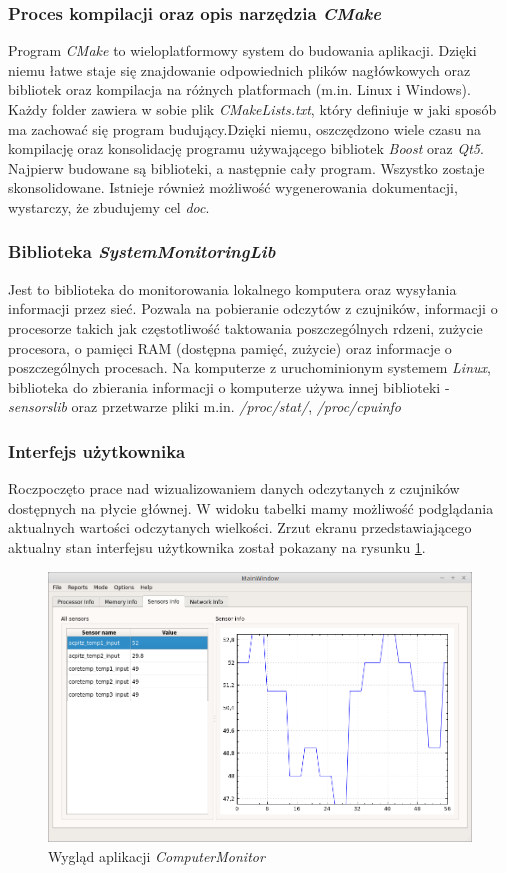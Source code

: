 \documentclass[a4paper]{article}
\begin{document}
\subsubsection{Proces kompilacji oraz opis narzędzia \textit{CMake}}
Program \textit{CMake} to wieloplatformowy system do budowania aplikacji. Dzięki niemu łatwe staje się
znajdowanie odpowiednich plików nagłówkowych oraz bibliotek oraz kompilacja na różnych platformach (m.in. Linux i Windows). Każdy folder zawiera w sobie plik \textit{CMakeLists.txt}, który definiuje w jaki sposób ma zachować się program budujący.Dzięki niemu, oszczędzono wiele czasu na kompilację oraz konsolidację programu używającego bibliotek \textit{Boost} oraz \textit{Qt5}. Najpierw budowane są biblioteki, a następnie cały program. Wszystko zostaje skonsolidowane. Istnieje również możliwość wygenerowania dokumentacji, wystarczy, że zbudujemy cel \textit{doc}.

\subsubsection{Biblioteka \textit{SystemMonitoringLib}}
Jest to biblioteka do monitorowania lokalnego komputera oraz wysyłania informacji przez sieć. Pozwala na pobieranie odczytów z czujników, informacji o procesorze takich jak częstotliwość taktowania poszczególnych rdzeni, zużycie procesora, o pamięci RAM (dostępna pamięć, zużycie) oraz informacje o poszczególnych procesach. Na komputerze z uruchominionym systemem \textit{Linux}, biblioteka do zbierania informacji o komputerze używa innej biblioteki - \textit{sensorslib} oraz przetwarze pliki m.in. \textit{/proc/stat/}, \textit{/proc/cpuinfo}

\subsubsection{Interfejs użytkownika}
Roczpoczęto prace nad wizualizowaniem danych  odczytanych z czujników dostępnych na płycie głównej.
W widoku tabelki mamy możliwość podglądania aktualnych wartości odczytanych wielkości. Zrzut ekranu przedstawiającego aktualny stan interfejsu użytkownika został pokazany na rysunku \ref{wygladAplikacji}.

\begin{figure}[h]
	\centering
	\includegraphics[width=\linewidth]{img/wygladAplikacji.png}
	\caption{Wygląd aplikacji \textit{ComputerMonitor}}
	\label{wygladAplikacji}
\end{figure}
\end{document}
